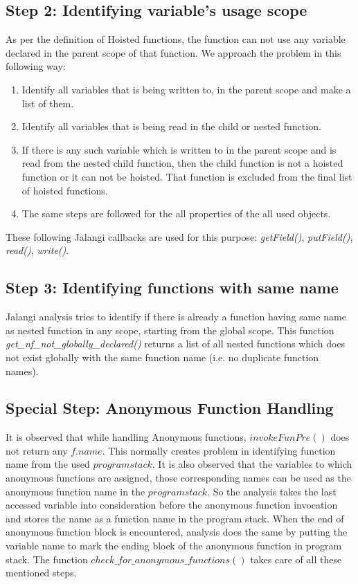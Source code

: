 \documentclass[accentcolor=tud0b,12pt,paper=a4]{tudreport}
\begin{document}
\subsection{Step 2: Identifying variable's usage scope}
As per the definition of Hoisted functions, the function can not use any variable declared in the parent scope of that function. We approach the problem in this following way:
\begin{enumerate}
	\item Identify all variables that is being written to, in the parent scope and make a list of them.
	\item Identify all variables that is being read in the child or nested function. 
	\item If there is any such variable which is written to in the parent scope and is read from the nested child function, then the child function is not a hoisted function or it can not be hoisted. That function is excluded from the final list of hoisted functions.
	\item The same steps are followed for the all properties of the all used objects.
\end{enumerate}
These following Jalangi callbacks are used for this purpose: \emph{getField()}, \emph{putField()}, \emph{read()}, \emph{write()}.

\subsection{Step 3: Identifying functions with same name}
Jalangi analysis tries to identify if there is already a function having same name as nested function in any scope, starting from the global scope. This function \emph{get\_nf\_not\_globally\_declared()} returns a list of all nested functions which does not exist globally with the same function name (i.e. no duplicate function names).

\subsection{Special Step: Anonymous Function Handling}
It is observed that while handling Anonymous functions, $invokeFunPre()$ does not return any $f.name$. This normally creates problem in identifying function name from the used $program stack$. It is also observed that the variables to which anonymous functions are assigned, those corresponding names can be used as the anonymous function name in the $program stack$. So the analysis takes the last accessed variable into consideration before the anonymous function invocation and stores the name as a function name in the program stack. When the end of anonymous function block is encountered, analysis does the same by putting the variable name to mark the ending block of the anonymous function in program stack. The function $check\_for\_anonymous\_functions()$ takes care of all these mentioned steps.
\end{document}
